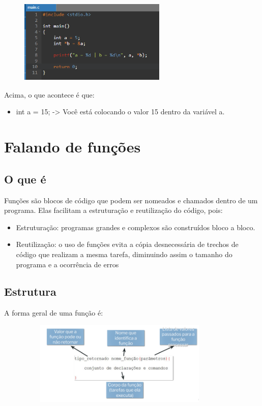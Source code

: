 \documentclass{report}
\begin{document}
	\begin{figure}[ht]
		\centering
		\includegraphics[width=7cm,height=4cm,keepaspectratio=false]{imagens/ponteiro.png}
		
	\end{figure}
	
	Acima, o que acontece é que:
	
	\begin{itemize}
		\item int a = 15; -> Você está colocando o valor 15 dentro da variável a.
	\end{itemize}
	
	\chapter{Falando de funções}
	
	\section{O que é}
	Funções são blocos de código que podem ser nomeados e chamados dentro de um programa. Elas facilitam a estruturação e reutilização do código, pois:
	
	\begin{itemize}
		\item Estruturação: programas grandes e complexos são construídos bloco a bloco.
		\item Reutilização: o uso de funções evita a cópia desnecessária de trechos de código que realizam a mesma tarefa, diminuindo assim o tamanho do programa e a ocorrência de erros
	\end{itemize}
	
	\section{Estrutura}
	A forma geral de uma função é:
	
	\begin{center}
		
		\includegraphics[width=12cm,height=4cm,keepaspectratio=false]{imagens/func.png}
		
	\end{center}
	
\end{document}
